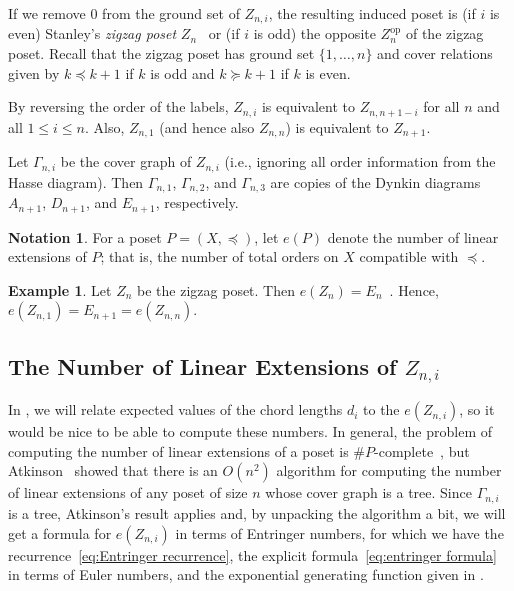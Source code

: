 \documentclass{article}
\theoremstyle{definition}
\newtheorem*{example}{Example}
\newtheorem*{notation}{Notation}
\begin{document}
If we remove 0 from the ground set of $Z_{n,i}$, the resulting induced poset is (if $i$ is even) Stanley's \emph{zigzag poset} $Z_n$~\cite[Exercise~3.66]{stanleyEnumerativeCombinatorics2011} or (if $i$ is odd) the opposite $Z_n^{\text{op}}$ of the zigzag poset. Recall that the zigzag poset has ground set $\{1,\dots , n\}$ and cover relations given by $k \preceq k+1$ if $k$ is odd and $k \succeq k+1$ if $k$ is even.

By reversing the order of the labels, $Z_{n,i}$ is equivalent to $Z_{n,n+1-i}$ for all $n$ and all $1 \leq i \leq n$. Also, $Z_{n,1}$ (and hence also $Z_{n,n}$) is equivalent to $Z_{n+1}$.

Let $\Gamma_{n,i}$ be the cover graph of $Z_{n,i}$ (i.e., ignoring all order information from the Hasse diagram). Then $\Gamma_{n,1}$, $\Gamma_{n,2}$, and $\Gamma_{n,3}$ are copies of the Dynkin diagrams $A_{n+1}$, $D_{n+1}$, and $E_{n+1}$, respectively.

\begin{notation}
	For a poset $P = (X,\preceq)$, let $e(P)$ denote the number of linear extensions of $P$; that is, the number of total orders on $X$ compatible with $\preceq$.
\end{notation}

\begin{example}
	Let $Z_n$ be the zigzag poset. Then $e(Z_n) = E_n$~\cite[Exercise~3.66(c)]{stanleyEnumerativeCombinatorics2011}. Hence, $e(Z_{n,1}) = E_{n+1} = e(Z_{n,n})$.
\end{example}

\subsection{The Number of Linear Extensions of $Z_{n,i}$}
\label{sub:linear extensions of zni}


In , we will relate expected values of the chord lengths $d_i$ to the $e(Z_{n,i})$, so it would be nice to be able to compute these numbers. In general, the problem of computing the number of linear extensions of a poset is $\# P$-complete~\cite{linialHardEnumerationProblems1986,brightwellCountingLinearExtensions1991}, but Atkinson~\cite{atkinsonComputingNumberLinear1990} showed that there is an $O(n^2)$ algorithm for computing the number of linear extensions of any poset of size $n$ whose cover graph is a tree. Since $\Gamma_{n,i}$ is a tree, Atkinson's result applies and, by unpacking the algorithm a bit, we will get a formula for $e(Z_{n,i})$ in terms of Entringer numbers, for which we have the recurrence~\eqref{eq:Entringer recurrence}, the explicit formula~\eqref{eq:entringer formula} in terms of Euler numbers, and the exponential generating function given in . 
\end{document}
